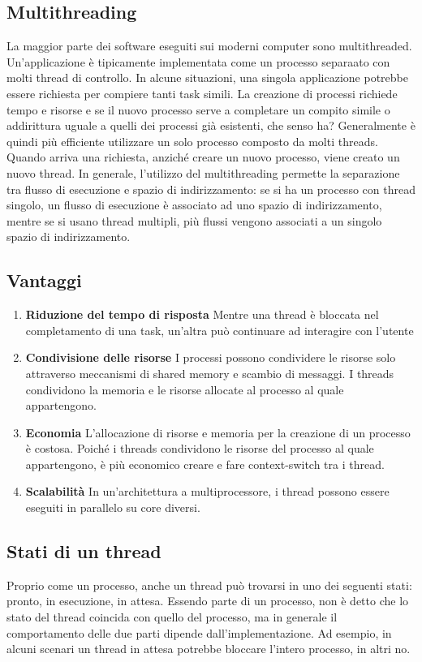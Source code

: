 \documentclass[a4]{article}
\begin{document}
\subsection{Multithreading}
La maggior parte dei software eseguiti sui moderni computer sono multithreaded. Un'applicazione è tipicamente implementata come un processo separaato con molti thread di controllo. In alcune situazioni, una singola applicazione potrebbe essere richiesta per compiere tanti task simili. La creazione di processi richiede tempo e risorse e se il nuovo processo serve a completare un compito simile o addirittura uguale a quelli dei processi già esistenti, che senso ha? Generalmente è quindi più efficiente utilizzare un solo processo composto da molti threads. Quando arriva una richiesta, anziché creare un nuovo processo, viene creato un nuovo thread. In generale, l'utilizzo del multithreading permette la separazione tra flusso di esecuzione e spazio di indirizzamento: se si ha un processo con thread singolo, un flusso di esecuzione è associato ad uno spazio di indirizzamento, mentre se si usano thread multipli, più flussi vengono associati a un singolo spazio di indirizzamento.

\subsection{Vantaggi}
\begin{enumerate}
    \item \textbf{Riduzione del tempo di risposta} Mentre una thread è bloccata nel completamento di una task, un'altra può continuare ad interagire con l'utente
    \item \textbf{Condivisione delle risorse} I processi possono condividere le risorse solo attraverso meccanismi di shared memory e scambio di messaggi. I threads condividono la memoria e le risorse allocate al processo al quale appartengono.
    \item \textbf{Economia} L'allocazione di risorse e memoria per la creazione di un processo è costosa. Poiché i threads condividono le risorse del processo al quale appartengono, è più economico creare e fare context-switch tra i thread.
    \item \textbf{Scalabilità} In un'architettura a multiprocessore, i thread possono essere eseguiti in parallelo su core diversi.
\end{enumerate}

\subsection{Stati di un thread}
Proprio come un processo, anche un thread può trovarsi in uno dei seguenti stati: pronto, in esecuzione, in attesa. Essendo parte di un processo, non è detto che lo stato del thread coincida con quello del processo, ma in generale il comportamento delle due parti dipende dall'implementazione. Ad esempio, in alcuni scenari un thread in attesa potrebbe bloccare l'intero processo, in altri no.
\end{document}
